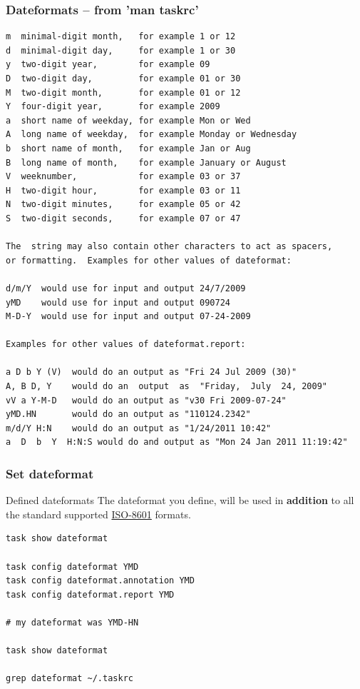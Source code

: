 \documentclass[t]{beamer}
\begin{document}
\begin{frame}[fragile]\frametitle{Dateformats -- from 'man taskrc'}
    \begin{lstlisting}
m  minimal-digit month,   for example 1 or 12
d  minimal-digit day,     for example 1 or 30
y  two-digit year,        for example 09
D  two-digit day,         for example 01 or 30
M  two-digit month,       for example 01 or 12
Y  four-digit year,       for example 2009
a  short name of weekday, for example Mon or Wed
A  long name of weekday,  for example Monday or Wednesday
b  short name of month,   for example Jan or Aug
B  long name of month,    for example January or August
V  weeknumber,            for example 03 or 37
H  two-digit hour,        for example 03 or 11
N  two-digit minutes,     for example 05 or 42
S  two-digit seconds,     for example 07 or 47

The  string may also contain other characters to act as spacers,
or formatting.  Examples for other values of dateformat:

d/m/Y  would use for input and output 24/7/2009
yMD    would use for input and output 090724
M-D-Y  would use for input and output 07-24-2009

Examples for other values of dateformat.report:

a D b Y (V)  would do an output as "Fri 24 Jul 2009 (30)"
A, B D, Y    would do an  output  as  "Friday,  July  24, 2009"
vV a Y-M-D   would do an output as "v30 Fri 2009-07-24"
yMD.HN       would do an output as "110124.2342"
m/d/Y H:N    would do an output as "1/24/2011 10:42"
a  D  b  Y  H:N:S would do and output as "Mon 24 Jan 2011 11:19:42"\end{lstlisting}
\end{frame}

\begin{frame}[fragile]\frametitle{Set dateformat}
    \begin{alertblock}{Defined dateformats}
        The dateformat you define, will be used in \textbf{addition} to all the standard supported \href{https://en.wikipedia.org/wiki/ISO_8601}{ISO-8601} formats.
    \end{alertblock}

    \vfill
    \begin{lstlisting}
task show dateformat

task config dateformat YMD
task config dateformat.annotation YMD
task config dateformat.report YMD

# my dateformat was YMD-HN

task show dateformat

grep dateformat ~/.taskrc\end{lstlisting}
\end{frame}
\end{document}
